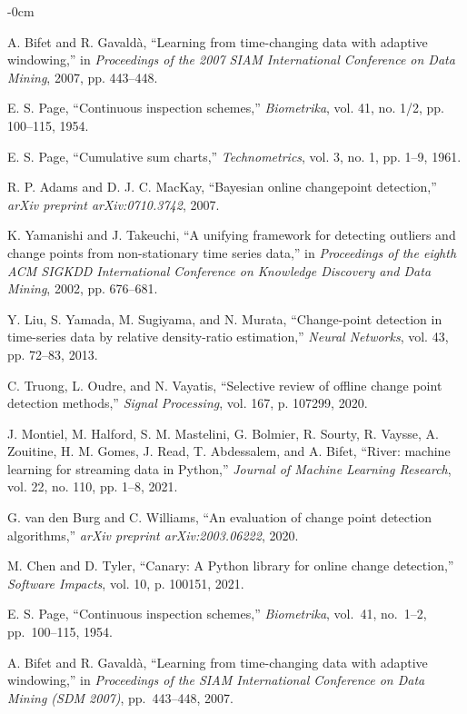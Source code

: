 \documentclass[journal,article,submit,pdftex,moreauthors]{Definitions/mdpi}
\begin{document}
\begin{adjustwidth}{-\extralength}{0cm}
\begin{thebibliography}{999}
A. Bifet and R. Gavaldà, ``Learning from time-changing data with adaptive windowing,'' in \emph{Proceedings of the 2007 SIAM International Conference on Data Mining}, 2007, pp. 443--448.

E. S. Page, ``Continuous inspection schemes,'' \emph{Biometrika}, vol. 41, no. 1/2, pp. 100--115, 1954.

E. S. Page, ``Cumulative sum charts,'' \emph{Technometrics}, vol. 3, no. 1, pp. 1--9, 1961.

R. P. Adams and D. J. C. MacKay, ``Bayesian online changepoint detection,'' \emph{arXiv preprint arXiv:0710.3742}, 2007.

K. Yamanishi and J. Takeuchi, ``A unifying framework for detecting outliers and change points from non-stationary time series data,'' in \emph{Proceedings of the eighth ACM SIGKDD International Conference on Knowledge Discovery and Data Mining}, 2002, pp. 676--681.

Y. Liu, S. Yamada, M. Sugiyama, and N. Murata, ``Change-point detection in time-series data by relative density-ratio estimation,'' \emph{Neural Networks}, vol. 43, pp. 72--83, 2013.

C. Truong, L. Oudre, and N. Vayatis, ``Selective review of offline change point detection methods,'' \emph{Signal Processing}, vol. 167, p. 107299, 2020.

J. Montiel, M. Halford, S. M. Mastelini, G. Bolmier, R. Sourty, R. Vaysse, A. Zouitine, H. M. Gomes, J. Read, T. Abdessalem, and A. Bifet, ``River: machine learning for streaming data in Python,'' \emph{Journal of Machine Learning Research}, vol. 22, no. 110, pp. 1--8, 2021.

G. van den Burg and C. Williams, ``An evaluation of change point detection algorithms,'' \emph{arXiv preprint arXiv:2003.06222}, 2020.

M. Chen and D. Tyler, ``Canary: A Python library for online change detection,'' \emph{Software Impacts}, vol. 10, p. 100151, 2021.


E. S. Page, ``Continuous inspection schemes,'' \textit{Biometrika}, vol.~41, no.~1--2, pp.~100--115, 1954.

A. Bifet and R. Gavaldà, ``Learning from time-changing data with adaptive windowing,'' in \textit{Proceedings of the SIAM International Conference on Data Mining (SDM 2007)}, pp.~443--448, 2007.


\end{thebibliography}
\end{adjustwidth}
\end{document}

